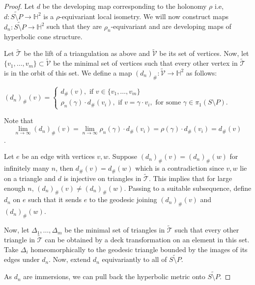 \begin{proof}
	Let $d$ be the developing map corresponding to the holonomy $\rho$ i.e, $d : \widetilde{S \setminus P} \rightarrow \mathbb{H}^2$ is a $\rho$-equivariant local isometry. We will now construct maps $d_n: \widetilde{S \setminus P} \rightarrow \mathbb{H}^2$ such that they are $\rho_n$-equivariant and are developing maps of hyperbolic cone structure.
	
	Let $\widetilde{\mathcal{T}}$ be the lift of a triangulation as above and $\mathcal{\widetilde{V}}$ be its set of vertices. Now, let $\{v_1, \ldots, v_m\} \subset \mathcal{\widetilde{V}} $ be the minimal set of vertices such that every other vertex in $\widetilde{\mathcal{T}}$ is in the orbit of this set. We define a map $(d_n)_{\#}: \mathcal{\widetilde{V}} \rightarrow \mathbb{H}^2$ as follows:
	
	\begin{center}
		$(d_n)_{\#}(v)= 
		\begin{cases}
			d_{\#}(v), \text{ if } v \in \{v_1, \ldots, v_m\} \\
			\rho_n(\gamma) \cdot d_{\#}(v_i), \text{ if } v = \gamma \cdot v_i, \text{ for some } \gamma \in \pi_1(S \setminus P).
		\end{cases}$
	\end{center}
	
	Note that \[\displaystyle \lim_{n \rightarrow \infty} (d_n)_{\#}(v) = \displaystyle \lim_{n \rightarrow \infty} \rho_n(\gamma) \cdot d_{\#}(v_i) = \rho(\gamma) \cdot d_{\#}(v_i) = d_{\#}(v)\].
	
	Let $e$ be an edge with vertices $v, w$. Suppose $(d_n)_{\#}(v) = (d_n)_{\#}(w)$ for infinitely many $n$, then $d_{\#}(v) = d_{\#}(w)$ which is a contradiction since $v,w$ lie on a triangle and $d$ is injective on triangles in $\widetilde{\mathcal{T}}$. This implies that for large enough $n$, $(d_n)_{\#}(v) \neq (d_n)_{\#}(w)$. Passing to a suitable subsequence, define $d_n$ on $e$ such that it sends $e$ to the geodesic joining $(d_n)_{\#}(v)$ and $(d_n)_{\#}(w)$.
	
	Now, let $\Delta_1, \ldots, \Delta_m$ be the minimal set of triangles in $\widetilde{\mathcal{T}}$ such that every other triangle in $\widetilde{\mathcal{T}}$ can be obtained by a deck transformation on an element in this set. Take $\Delta_i$ homeomorphically to the geodesic triangle bounded by the images of its edges under $d_n$. Now, extend $d_n$ equivariantly to all of $\widetilde{S \setminus P}$.
	
	As $d_n$ are immersions, we can pull back the hyperbolic metric onto $\widetilde{S \setminus P}$. 
	

\end{proof}
